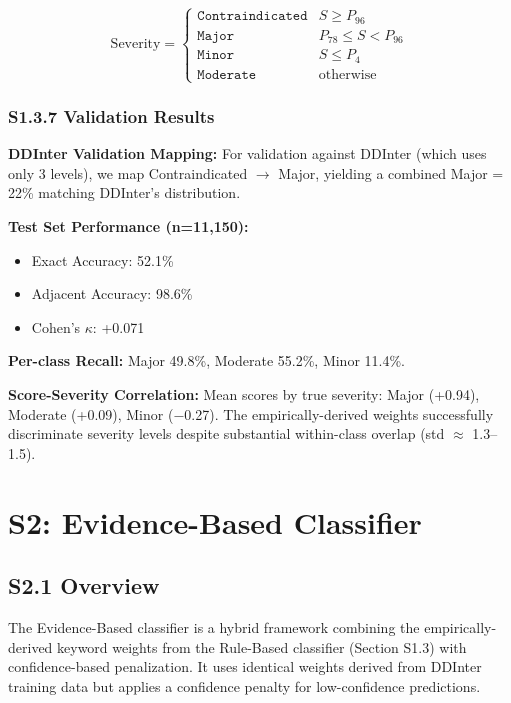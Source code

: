\documentclass[11pt,a4paper]{article}
\begin{document}
\begin{equation}
\text{Severity} = 
\begin{cases}
\texttt{Contraindicated} & S \geq P_{96} \\
\texttt{Major} & P_{78} \leq S < P_{96} \\
\texttt{Minor} & S \leq P_{4} \\
\texttt{Moderate} & \text{otherwise}
\end{cases}
\end{equation}

\subsubsection{S1.3.7 Validation Results}

\textbf{DDInter Validation Mapping:} For validation against DDInter (which uses only 3 levels), we map Contraindicated $\rightarrow$ Major, yielding a combined Major = 22\% matching DDInter's distribution.

\textbf{Test Set Performance (n=11,150):}
\begin{itemize}
\item Exact Accuracy: 52.1\%
\item Adjacent Accuracy: 98.6\%
\item Cohen's $\kappa$: +0.071
\end{itemize}

\textbf{Per-class Recall:} Major 49.8\%, Moderate 55.2\%, Minor 11.4\%.

\textbf{Score-Severity Correlation:} Mean scores by true severity: Major (+0.94), Moderate (+0.09), Minor ($-$0.27). The empirically-derived weights successfully discriminate severity levels despite substantial within-class overlap (std $\approx$ 1.3--1.5).

\newpage
\section{S2: Evidence-Based Classifier}

\subsection{S2.1 Overview}

The Evidence-Based classifier is a hybrid framework combining the empirically-derived keyword weights from the Rule-Based classifier (Section S1.3) with confidence-based penalization. It uses identical weights derived from DDInter training data but applies a confidence penalty for low-confidence predictions.
\end{document}
